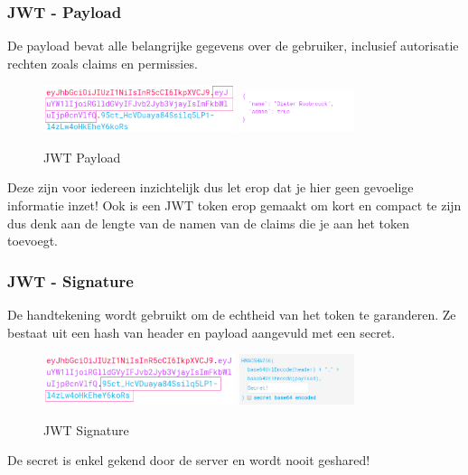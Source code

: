 \documentclass{article}
\begin{document}
\subsubsection{JWT - Payload}
De payload bevat alle belangrijke gegevens over de gebruiker, inclusief autorisatie
rechten zoals claims en permissies.

\begin{figure}[H]
    \centering
    \includegraphics[width=0.5\textwidth]{img/jwt4.png}
    \includegraphics[width=0.3\textwidth]{img/jwt5.png}
    \caption{JWT Payload}
\end{figure}

Deze zijn voor iedereen inzichtelijk dus let erop dat je hier geen gevoelige informatie inzet!
Ook is een JWT token erop gemaakt om kort en compact te zijn dus denk aan de lengte van de namen van de
claims die je aan het token toevoegt.

\subsubsection{JWT - Signature}
De handtekening wordt gebruikt om de echtheid van het token te garanderen.
Ze bestaat uit een hash van header en payload aangevuld met een secret.

\begin{figure}[H]
    \centering
    \includegraphics[width=0.5\textwidth]{img/jwt6.png}
    \includegraphics[width=0.3\textwidth]{img/jwt7.png}
    \caption{JWT Signature}
\end{figure}

De secret is enkel gekend door de server en wordt nooit geshared!
\end{document}
